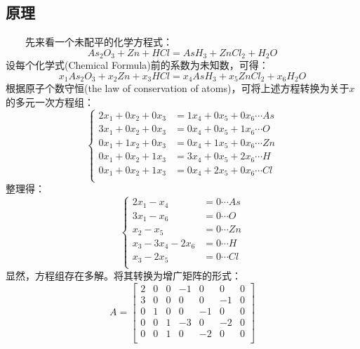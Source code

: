 \documentclass[1pt]{article}
\begin{document}
  \subsection{原理}
    　　先来看一个未配平的化学方程式：
    \begin{equation}
      As_{2}O_{3}+Zn+HCl=AsH_{3}+ZnCl_{2}+H_{2}O
    \end{equation}
    设每个化学式(Chemical Formula)前的系数为未知数，可得：
    \begin{equation}
      x_{1}As_{2}O_{3}+x_{2}Zn+x_{3}HCl=x_{4}AsH_{3}+x_{5}ZnCl_{2}+x_{6}H_{2}O
    \end{equation}
    根据原子个数守恒(the law of conservation of atoms)，可将上述方程转换为关于$x$的多元一次方程组：\\
    \begin{equation}
      \left\{
        \begin{aligned}
          2x_{1}+0x_{2}+0x_{3}&=1x_{4}+0x_{5}+0x_{6}\cdots{}As\\
          3x_{1}+0x_{2}+0x_{3}&=0x_{4}+0x_{5}+1x_{6}\cdots{}O\\
          0x_{1}+1x_{2}+0x_{3}&=0x_{4}+1x_{5}+0x_{6}\cdots{}Zn\\
          0x_{1}+0x_{2}+1x_{3}&=3x_{4}+0x_{5}+2x_{6}\cdots{}H\\
          0x_{1}+0x_{2}+1x_{3}&=0x_{4}+2x_{5}+0x_{6}\cdots{}Cl\\
        \end{aligned}
      \right.
    \end{equation}
    整理得：\\
    \begin{equation}
      \left\{
        \begin{aligned}
          2x_{1}-x_{4}&=0\cdots{}As\\
          3x_{1}-x_{6}&=0\cdots{}O\\
          x_{2}-x_{5}&=0\cdots{}Zn\\
          x_{3}-3x_{4}-2x_{6}&=0\cdots{}H\\
          x_{3}-2x_{5}&=0\cdots{}Cl\\
        \end{aligned}
      \right.
    \end{equation}
    显然，方程组存在多解。将其转换为增广矩阵的形式：\\
    \begin{equation}
      A=\left [
        \begin{array}{cccccc|c}
          2 & 0 & 0 & -1 & 0 & 0 & 0 \\
          3 & 0 & 0 & 0 & 0 & -1 & 0 \\
          0 & 1 & 0 & 0 & -1 & 0 & 0 \\
          0 & 0 & 1 & -3 & 0 & -2 & 0 \\
          0 & 0 & 1 & 0 & -2 & 0 & 0 \\
        \end{array}
      \right]
    \end{equation}
\end{document}
